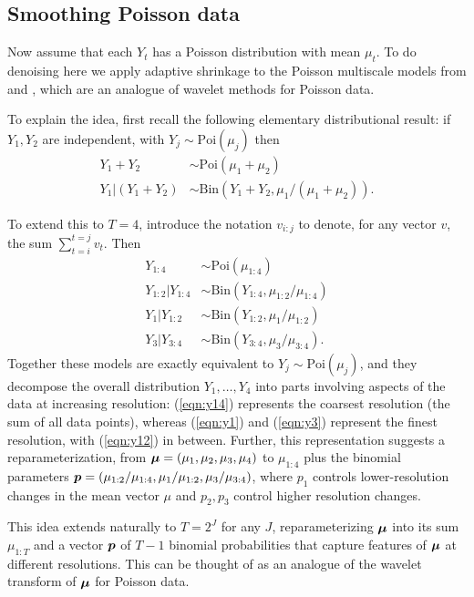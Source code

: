 \documentclass[12pt]{article}
\begin{document}
 \subsection{Smoothing Poisson data}

\def\Poi{\text{Poi}}
\def\Bin{\text{Bin}}

Now assume that each $Y_t$ has a Poisson distribution with mean $\mu_t$.
To do denoising here we apply adaptive shrinkage to the Poisson multiscale models
from \cite{Nowak2000Statistical} and \cite{Timmermann1999Multiscale}, which are an analogue of
wavelet methods for Poisson data.

To explain the idea, first recall the following elementary distributional result:
if $Y_1,Y_2$ are independent, with $Y_j \sim \Poi(\mu_j)$ then 
\begin{align}
Y_1 + Y_2 & \sim \Poi(\mu_1 + \mu_2) \\
Y_1 | (Y_1+Y_2) & \sim \Bin(Y_1+Y_2, \mu_1/(\mu_1+\mu_2)).
\end{align} 

To extend this to $T=4$, introduce the notation $v_{i:j}$ to denote, for any vector $v$, 
the sum $\sum_{t=i}^{t=j} v_t$.  Then 
\begin{align} 
Y_{1:4} & \sim \Poi(\mu_{1:4}) \label{eqn:y14} \\
Y_{1:2} | Y_{1:4} & \sim \Bin(Y_{1:4}, \mu_{1:2}/\mu_{1:4})  \label{eqn:y12} \\
Y_1 | Y_{1:2} & \sim \Bin(Y_{1:2}, \mu_1/\mu_{1:2}) \label{eqn:y1} \\ 
Y_3 | Y_{3:4} & \sim \Bin(Y_{3:4}, \mu_3/\mu_{3:4}). \label{eqn:y3}
\end{align} 
Together these models are exactly equivalent to $Y_j \sim \Poi(\mu_j)$, and
they decompose the overall distribution $Y_1,\dots,Y_4$ into parts involving aspects of the data at 
increasing resolution: (\ref{eqn:y14}) represents the coarsest resolution (the sum of all data points), 
whereas (\ref{eqn:y1}) and (\ref{eqn:y3}) represent the finest resolution, with (\ref{eqn:y12}) in between. 
Further, this representation suggests a reparameterization, from $\bm{\mu}=(\mu_1,\mu_2,\mu_3,\mu_4)$
to $\mu_{1:4}$ plus the binomial parameters $\bm{p}=(\mu_{1:2}/\mu_{1:4}, \mu_1/\mu_{1:2}, \mu_3/\mu_{3:4})$, where 
$p_1$ controls lower-resolution changes in the mean vector $\mu$ and $p_2,p_3$ control higher resolution changes.

This idea extends naturally to $T=2^J$ for any $J$, reparameterizing $\bm{\mu}$ into its sum $\mu_{1:T}$
and a vector $\bm{p}$ of $T-1$ binomial probabilities that capture features of $\bm{\mu}$ at different resolutions.
This can be thought of as an analogue of the wavelet transform of $\bm{\mu}$ for Poisson data.
\end{document}
